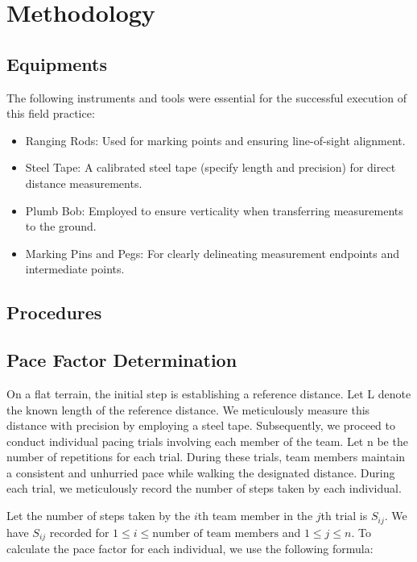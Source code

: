 \documentclass[12pt]{article}
\begin{document}
\newpage
\section*{Methodology}

\subsection*{Equipments}

The following instruments and tools were essential for the successful execution of this field practice:
\begin{itemize}
\item  Ranging Rods: Used for marking points and ensuring line-of-sight alignment.
\item  Steel Tape:  A calibrated steel tape (specify length and precision) for direct distance measurements.
\item  Plumb Bob: Employed to ensure verticality when transferring measurements to the ground.
\item  Marking Pins and Pegs: For clearly delineating measurement endpoints and intermediate points.
\end{itemize}

\subsection*{Procedures}

\subsection*{Pace Factor Determination}

On a flat terrain, the initial step is establishing a reference distance. Let L denote the known length of the reference distance. We meticulously measure this distance with precision by employing a steel tape. Subsequently, we proceed to conduct individual pacing trials involving each member of the team. Let n be the number of repetitions for each trial. During these trials, team members maintain a consistent and unhurried pace while walking the designated distance. During each trial, we meticulously record the number of steps taken by each individual.

Let the number of steps taken by the \(i\)th team member in the \(j\)th trial is \(S_{ij}\). We have \(S_{ij}\) recorded for \(1 \leq i \leq \text{number of team members}\) and \(1 \leq j \leq n\). To calculate the pace factor for each individual, we use the following formula:
\end{document}
